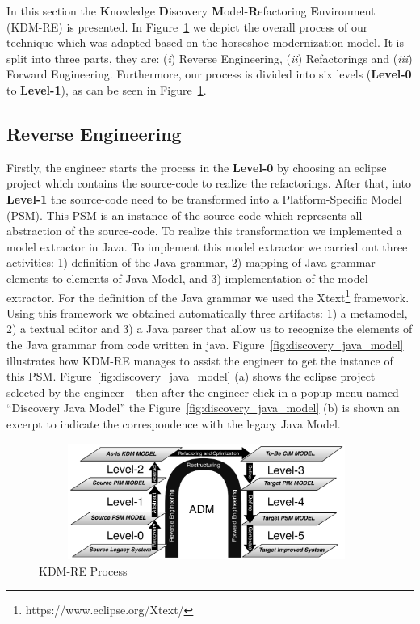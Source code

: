 In this section the \textbf{K}nowledge \textbf{D}iscovery \textbf{M}odel-\textbf{R}efactoring \textbf{E}nvironment (KDM-RE) is presented. 
In Figure~\ref{fig:process} we depict the overall process of our technique which was adapted based on the horseshoe modernization model. 
It is split into three parts, they are: 
(\textit{i}) Reverse Engineering, 
(\textit{ii}) Refactorings and 
(\textit{iii}) Forward Engineering. 
Furthermore, our process is divided into six levels (\textbf{Level-0} to \textbf{Level-1}), as can be seen in Figure~\ref{fig:process}. 

\subsection{Reverse Engineering}

Firstly, the engineer starts the process in the \textbf{Level-0} by choosing an eclipse project which contains the source-code to realize the refactorings.  
After that, into \textbf{Level-1} the source-code need to be transformed into a Platform-Specific Model (PSM). 
This PSM is an instance of the source-code which represents all abstraction of the source-code. To realize this transformation we implemented a model extractor in Java. To implement this model extractor we carried out three activities: 1) definition of the Java grammar, 2) mapping of Java grammar elements to elements of Java Model, and 3) implementation of the model extractor. For the definition of the Java grammar we used the Xtext\footnote{https://www.eclipse.org/Xtext/} framework. Using this framework we obtained automatically three artifacts: 1) a metamodel, 2) a textual editor and 3) a Java parser that allow us to recognize the elements of the Java grammar from code written in java. 
Figure~\ref{fig:discovery_java_model} illustrates how KDM-RE manages to assist the engineer to get the instance of this PSM. Figure~\ref{fig:discovery_java_model} (a) shows the eclipse project selected by the engineer - then after the engineer click in a popup menu named ``Discovery Java Model'' the Figure~\ref{fig:discovery_java_model} (b) is shown an excerpt to indicate the correspondence with the legacy Java Model.

\begin{figure}[!ht]
\centering
  \includegraphics[width=11cm, height=3.8cm]{figure/processoDaFerramenta}
\caption{KDM-RE Process}
\label{fig:process}
\end{figure} 

